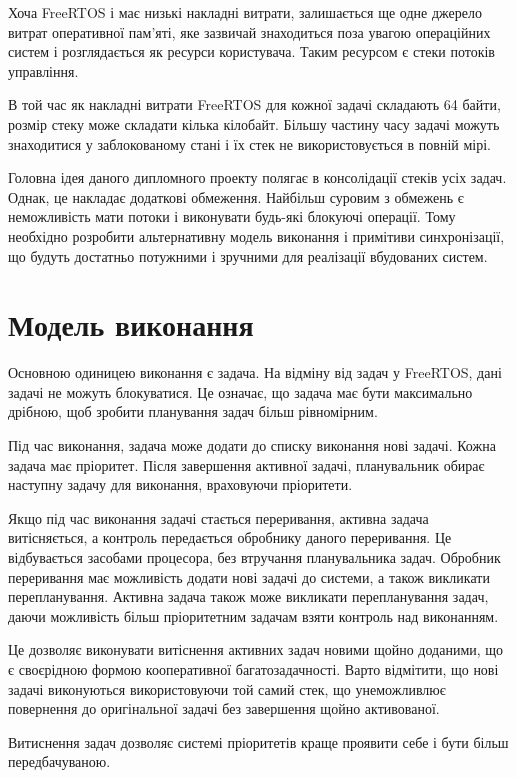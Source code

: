 \documentclass[main.tex]{subfiles}
\begin{document}
Хоча FreeRTOS і має низькі накладні витрати, залишається ще одне джерело витрат оперативної пам'яті, яке зазвичай знаходиться поза увагою операційних систем і розглядається як ресурси користувача. Таким ресурсом є стеки потоків управління.

В той час як накладні витрати FreeRTOS для кожної задачі складають 64 байти, розмір стеку може складати кілька кілобайт. Більшу частину часу задачі можуть знаходитися у заблокованому стані і їх стек не використовується в повній мірі.

Головна ідея даного дипломного проекту полягає в консолідації стеків усіх задач. Однак, це накладає додаткові обмеження. Найбільш суровим з обмежень є неможливість мати потоки і виконувати будь-які блокуючі операції. Тому необхідно розробити альтернативну модель виконання і примітиви синхронізації, що будуть достатньо потужними і зручними для реалізації вбудованих систем.

\section{Модель виконання}

Основною одиницею виконання є задача. На відміну від задач у FreeRTOS, дані задачі не можуть блокуватися. Це означає, що задача має бути максимально дрібною, щоб зробити планування задач більш рівномірним.

Під час виконання, задача може додати до списку виконання нові задачі. Кожна задача має пріоритет. Після завершення активної задачі, планувальник обирає наступну задачу для виконання, враховуючи пріоритети.

Якщо під час виконання задачі стається переривання, активна задача витісняється, а контроль передається обробнику даного переривання. Це відбувається засобами процесора, без втручання планувальника задач. Обробник переривання має можливість додати нові задачі до системи, а також викликати перепланування. Активна задача також може викликати перепланування задач, даючи можливість більш пріоритетним задачам взяти контроль над виконанням.

Це дозволяє виконувати витіснення активних задач новими щойно доданими, що є своєрідною формою кооперативної багатозадачності. Варто відмітити, що нові задачі виконуються використовуючи той самий стек, що унеможливлює повернення до оригінальної задачі без завершення щойно активованої.

Витиснення задач дозволяє системі пріоритетів краще проявити себе і бути більш передбачуваною.
\end{document}
